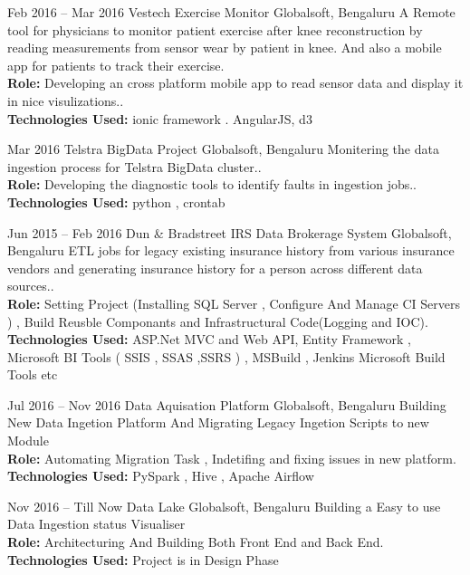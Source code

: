 \documentclass[]{friggeri-cv} %
\begin{document}
\begin{entrylist}
\entry
{Feb 2016 -- Mar 2016}
{Vestech Exercise Monitor}
{Globalsoft, Bengaluru}
{A Remote tool for physicians to monitor patient exercise after knee reconstruction by reading measurements from sensor wear by patient in knee. And also a mobile app for patients to track their exercise.\\
\textbf{Role:} Developing an cross platform mobile app to read sensor data and display it in nice visulizations..\\
\textbf{Technologies Used:} ionic framework . AngularJS, d3}
\end{entrylist}

\begin{entrylist}
\entry
{Mar 2016}
{Telstra BigData Project}
{Globalsoft, Bengaluru}
{Monitering the data ingestion process for Telstra BigData cluster..\\
\textbf{Role:} Developing the diagnostic tools to identify faults in ingestion jobs..\\
\textbf{Technologies Used:} python , crontab}
\end{entrylist}

\begin{entrylist}
\entry
{Jun 2015 -- Feb 2016}
{Dun \& Bradstreet IRS Data Brokerage System}
{Globalsoft, Bengaluru}
{ETL jobs for legacy existing insurance history from various insurance vendors and generating insurance history for a person across different data sources..\\
\textbf{Role:} Setting Project (Installing SQL Server , Configure And Manage CI Servers ) ,  
Build Reusble Componants and Infrastructural Code(Logging and IOC).\\
\textbf{Technologies Used:} ASP.Net MVC and Web API, Entity Framework , Microsoft BI Tools ( SSIS , SSAS ,SSRS ) , 
MSBuild , Jenkins Microsoft Build Tools etc}
\end{entrylist}


\begin{entrylist}
\entry
{Jul 2016 -- Nov 2016}
{Data Aquisation Platform}
{Globalsoft, Bengaluru}
{Building New Data Ingetion Platform And Migrating Legacy Ingetion Scripts to new Module\\
\textbf{Role:} Automating Migration Task , Indetifing and fixing issues in new platform.\\
\textbf{Technologies Used:} PySpark , Hive , Apache Airflow}
\end{entrylist}

\begin{entrylist}
\entry
{Nov 2016 -- Till Now}
{Data Lake}
{Globalsoft, Bengaluru}
{Building a Easy to use Data Ingestion status Visualiser \\
\textbf{Role:} Architecturing And Building Both Front End and Back End.\\
\textbf{Technologies Used:} Project is in Design Phase}
\end{entrylist}
\end{document}
